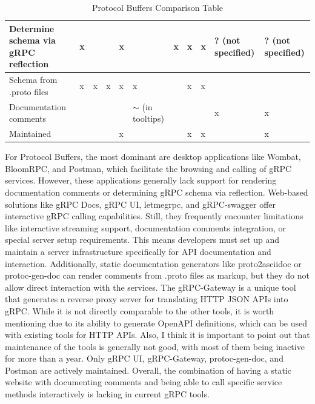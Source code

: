\begin{landscape}
\begin{table}[]
{\begin{tabular}{|l|l|l|l|l|l|l|l|l|l|l|}
                Determine schema via gRPC reflection & x               &                   &                    & x                &                      & x                     & x                     & x                & ? (not specified)       & ? (not specified)       \\ \hline
                Schema from .proto files             & x               & x                 & x                  & x                & x                    &                       & x                     & x                &                         &                         \\ \hline
                Documentation comments               &                 &                   &                    &                  & $\sim$ (in tooltips) &                       &                       &                  & x                       & x                       \\ \hline
                Maintained                           &                 &                   &                    & x                &                      &                       & x                     & x                &                         & x                       \\ \hline
            \end{tabular}%
        }
        \caption{Protocol Buffers Comparison Table}
        \label{tab:grpc-comparison-table}
    \end{table}
\end{landscape}

For Protocol Buffers, the most dominant are desktop applications like Wombat, BloomRPC, and Postman, which facilitate the browsing and calling of gRPC services.
However, these applications generally lack support for rendering documentation comments or determining gRPC schema via reflection.
Web-based solutions like gRPC Docs, gRPC UI, letmegrpc, and gRPC-swagger offer interactive gRPC calling capabilities.
Still, they frequently encounter limitations like interactive streaming support, documentation comments integration, or special server setup requirements.
This means developers must set up and maintain a server infrastructure specifically for API documentation and interaction.
Additionally, static documentation generators like proto2asciidoc or protoc-gen-doc can render comments from .proto files as markup, but they do not allow direct interaction with the services.
The gRPC-Gateway is a unique tool that generates a reverse proxy server for translating HTTP JSON APIs into gRPC\@.
While it is not directly comparable to the other tools, it is worth mentioning due to its ability to generate OpenAPI definitions, which can be used with existing tools for HTTP APIs.
Also, I think it is important to point out that maintenance of the tools is generally not good, with most of them being inactive for more than a year.
Only gRPC UI, gRPC-Gateway, protoc-gen-doc, and Postman are actively maintained.
Overall, the combination of having a static website with documenting comments and being able to call specific service methods interactively is lacking in current gRPC tools.

